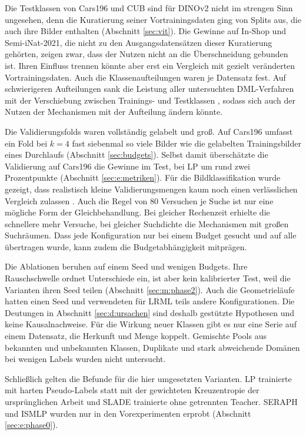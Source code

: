 Die Testklassen von Cars196 und \ac{CUB} sind für DINOv2 nicht im strengen Sinn ungesehen, denn die Kuratierung seiner Vortrainingsdaten ging von Splits aus, die auch ihre Bilder enthalten (Abschnitt \ref{sec:vit}). Die Gewinne auf In-Shop und Semi-iNat-2021, die nicht zu den Ausgangsdatensätzen dieser Kuratierung gehörten, zeigen zwar, dass der Nutzen nicht an die Überschneidung gebunden ist. Ihren Einfluss trennen könnte aber erst ein Vergleich mit gezielt veränderten Vortrainingsdaten. Auch die Klassenaufteilungen waren je Datensatz fest. Auf schwierigeren Aufteilungen sank die Leistung aller untersuchten \ac{DML}-Verfahren mit der Verschiebung zwischen Trainings- und Testklassen \cite{milbich_characterizing_2021}, sodass sich auch der Nutzen der Mechanismen mit der Aufteilung ändern könnte. 

Die Validierungsfolds waren vollständig gelabelt und groß. Auf Cars196 umfasst ein Fold bei $k=4$ fast siebenmal so viele Bilder wie die gelabelten Trainingsbilder eines Durchlaufs (Abschnitt \ref{sec:budgets}). Selbst damit überschätzte die Validierung auf Cars196 die Gewinne im Test, bei \ac{LP} um rund zwei Prozentpunkte (Abschnitt \ref{sec:e:metriken}). Für die Bildklassifikation wurde gezeigt, dass realistisch kleine Validierungsmengen kaum noch einen verlässlichen Vergleich zulassen \cite{oliver_realistic_2018}. Auch die Regel von 80 Versuchen je Suche ist nur eine mögliche Form der Gleichbehandlung. Bei gleicher Rechenzeit erhielte die schnellere \UEBL mehr Versuche, bei gleicher Suchdichte die Mechanismen mit großen Suchräumen. Dass jede Konfiguration nur bei einem Budget gesucht und auf alle übertragen wurde, kann zudem die Budgetabhängigkeit mitprägen.

Die Ablationen beruhen auf einem Seed und wenigen Budgets. Ihre Rauschschwelle ordnet Unterschiede ein, ist aber kein kalibrierter Test, weil die Varianten ihren Seed teilen (Abschnitt \ref{sec:m:phase2}). Auch die Geometrieläufe hatten einen Seed und verwendeten für \ac{LRML} teils andere Konfigurationen. Die Deutungen in Abschnitt \ref{sec:d:ursachen} sind deshalb gestützte Hypothesen und keine Kausalnachweise. Für die Wirkung neuer Klassen gibt es nur eine Serie auf einem Datensatz, die Herkunft und Menge koppelt. Gemischte Pools aus bekannten und unbekannten Klassen, Duplikate und stark abweichende Domänen bei wenigen Labels wurden nicht untersucht.

Schließlich gelten die Befunde für die hier umgesetzten Varianten. \ac{LP} trainierte mit harten Pseudo-Labels statt mit der gewichteten Kreuzentropie der ursprünglichen Arbeit und \ac{SLADE} trainierte ohne getrennten Teacher. \ac{SERAPH} und \ac{ISMLP} wurden nur in den Vorexperimenten erprobt (Abschnitt \ref{sec:e:phase0}). 

